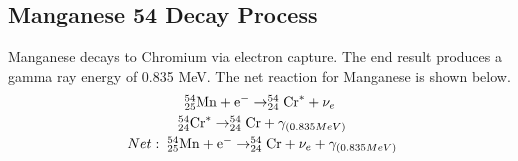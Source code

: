 \documentclass[%
 aip,
rsi,%
 amsmath,amssymb,
 reprint,%
author-numerical,%
]{revtex4-1}
\begin{document}
\subsection{Manganese 54 Decay Process}
Manganese decays to Chromium via electron capture. The end result produces a gamma ray energy of 0.835 MeV. The net reaction for Manganese is shown below.
\[\begin{array} {c} { _{25}^ { 54 }\mathrm { Mn }  + \mathrm { e } ^ { - } \rightarrow _{24} ^ { 54 }\mathrm { Cr } ^ { * } + \nu _ { e } }\vspace{1mm}\\\ { _{24}^ { 54 }\mathrm { Cr } ^ { *} \rightarrow _{24}^ { 54 }\mathrm { Cr } + \gamma_{( 0.835 M e V  ) }}\vspace{1mm}\\\ {Net:\hspace{1mm} _{25} ^ { 54 }\mathrm { Mn }  + \mathrm { e } ^ { - } \rightarrow _{24} ^ { 54 }\mathrm { Cr } + \nu _ { e } + \gamma_{( 0.835 M e V  )} } \end{array}\]
\end{document}
